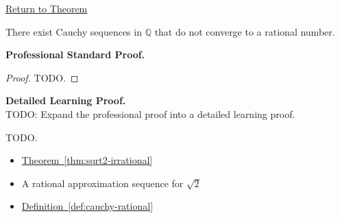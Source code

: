 \newpage
{}
\label{prf:cauchy-not-convergent-q}

\begin{remark*}[Return]
\hyperref[thm:cauchy-not-convergent-q]{Return to Theorem}
\end{remark*}

\begin{theorem*}
There exist Cauchy sequences in $\mathbb{Q}$ that do not converge to a rational number.
\end{theorem*}

\textbf{Professional Standard Proof.}~\\
\begin{proof}
TODO.
\end{proof}

\textbf{Detailed Learning Proof.}~\\
TODO: Expand the professional proof into a detailed learning proof.


\begin{remark*}
TODO.
\end{remark*}

\begin{dependencies}
\begin{itemize}
  \item \hyperref[thm:sqrt2-irrational]{Theorem~\ref*{thm:sqrt2-irrational}}
  \item A rational approximation sequence for $\sqrt{2}$
  \item \hyperref[def:cauchy-rational]{Definition~\ref*{def:cauchy-rational}}
\end{itemize}
\end{dependencies}

